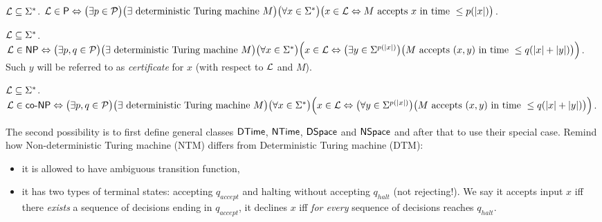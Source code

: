 		\begin{defn}\label{def:P}
			${\cal L} \subseteq \Sigma^*$. ${\cal L} \in \P \iff \bigl(\exists p \in {\cal P}\bigr) \bigl(\exists \textnormal{ deterministic Turing machine } M\bigr)\\ \bigl(\forall x \in \Sigma^*\bigr) \bigl(x \in {\cal L} \iff M \textnormal{ accepts } x \textnormal{ in time } \leq p(|x|)\bigr)$.
		\end{defn}
		
		\begin{defn}\label{def:NP}
			${\cal L} \subseteq \Sigma^*$. ${\cal L} \in \NP \iff \bigl(\exists p, q \in {\cal P}\bigr) \bigl(\exists \textnormal{ deterministic Turing machine } M\bigr)\\ \bigl(\forall x \in \Sigma^*\bigr) \Bigl(x \in {\cal L} \iff \bigl(\exists y \in \Sigma^{p(|x|)}\bigr) \bigl(M \textnormal{ accepts } (x,y) \textnormal{ in time } \leq q(|x|+|y|)\bigr)\Bigr)$.\\
			Such $y$ will be referred to as {\em certificate} for $x$ (with respect to $\cal L$ and $M$).
		\end{defn}
		
		\begin{defn}\label{def:coNP}
			${\cal L} \subseteq \Sigma^*$. ${\cal L} \in \coNP \iff \bigl(\exists p, q \in {\cal P}\bigr) \bigl(\exists \textnormal{ deterministic Turing machine } M\bigr)\\ \bigl(\forall x \in \Sigma^*\bigr) \Bigl(x \in {\cal L} \iff \bigl(\forall y \in \Sigma^{p(|x|)}\bigr) \bigl(M \textnormal{ accepts } (x,y) \textnormal{ in time } \leq q(|x|+|y|)\bigr)\Bigr)$.
		\end{defn}
		
		The second possibility is to first define general classes $\DTime$, $\NTime$, $\DSpace$ and $\NSpace$ and after that to use their special case. Remind how Non-deterministic Turing machine (NTM) differs from Deterministic Turing machine (DTM):
		\begin{itemize}
			\item it is allowed to have ambiguous transition function,
			\item it has two types of terminal states: accepting $q_{accept}$ and halting without accepting $q_{halt}$ (not rejecting!). We say it accepts input $x$ iff there {\em exists} a sequence of decisions ending in $q_{accept}$, it declines $x$ iff {\em for every} sequence of decisions reaches $q_{halt}$.
		\end{itemize}
		

